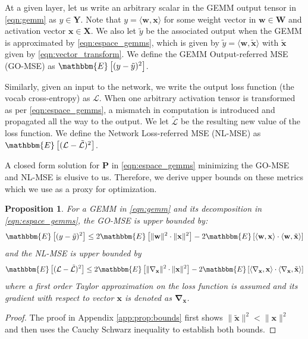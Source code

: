 \documentclass{article}
\theoremstyle{plain}
\newtheorem{proposition}[theorem]{Proposition}
\begin{document}
At a given layer, let us write an arbitrary scalar in the GEMM output tensor in \eqref{eqn:gemm} as $y\in \mathbf{Y}$. Note that $y=\langle \mathbf{w}, \mathbf{x} \rangle$ for some weight vector in $\mathbf{w}\in\mathbf{W}$ and activation vector $\mathbf{x}\in\mathbf{X}$. We also let $\tilde{y}$ be the associated output when the GEMM is approximated by \eqref{eqn:espace_gemms}, which is given by $\tilde{y}=\langle \mathbf{w}, \tilde{\mathbf{x}} \rangle$ with $\tilde{\mathbf{x}}$ given by \eqref{eqn:vector_transform}. We define the GEMM Output-referred MSE (GO-MSE) as 
$\mathbbm{E}\left[(y-\tilde{y})^2 \right]$.

Similarly, given an input to the network, we write the output loss function (the vocab cross-entropy) as $\mathcal{L}$. When one arbitrary activation tensor is transformed as per \eqref{eqn:espace_gemms}, a mismatch in computation is introduced and propagated all the way to the output. We let $\tilde{\mathcal{L}}$ be the resulting new value of the loss function. We define the Network Loss-referred MSE (NL-MSE) as $\mathbbm{E}\left[(\mathcal{L}-\tilde{\mathcal{L}})^2 \right]$.

A closed form solution for $\mathbf{P}$ in \eqref{eqn:espace_gemms} minimizing the GO-MSE and NL-MSE is elusive to us. Therefore, we derive upper bounds on these metrics which we use as a proxy for optimization.
\begin{proposition}
\label{prop:bounds}
    For a GEMM in \eqref{eqn:gemm} and its decomposition in \eqref{eqn:espace_gemms}, the GO-MSE is upper bounded by:
    \begin{align}
        \label{eqn:gomse_bound}
        \mathbbm{E}\left[(y-\tilde{y})^2 \right] \leq 2\mathbbm{E}\left[\lVert \mathbf{w} \rVert^2 \cdot \lVert \mathbf{x} \rVert^2 \right] -2\mathbbm{E}\left[ \langle\mathbf{w},\mathbf{x}\rangle \cdot\langle\mathbf{w},\tilde{\mathbf{x}}\rangle \right]
    \end{align}
    and the NL-MSE is upper bounded by
    \begin{align}
        \label{eqn:nlmse_bound}
        \mathbbm{E}\left[(\mathcal{L}-\tilde{\mathcal{L}})^2 \right] \leq 2\mathbbm{E}\left[\lVert \mathbf{\nabla}_{\mathbf{x}} \rVert^2 \cdot \lVert \mathbf{x} \rVert^2 \right] -2\mathbbm{E}\left[ \langle\mathbf{\nabla}_{\mathbf{x}},\mathbf{x}\rangle \cdot\langle\mathbf{\nabla}_{\mathbf{x}},\tilde{\mathbf{x}}\rangle \right]
    \end{align}
    where a first order Taylor approximation on the loss function is assumed and its gradient with respect to vector $\mathbf{x}$ is denoted as $\mathbf{\nabla}_{\mathbf{x}}$.
\end{proposition}
\begin{proof}
The proof in Appendix \ref{app:prop:bounds} first shows $\lVert \tilde{\mathbf{x}} \rVert^2<\lVert \mathbf{x} \rVert^2$ and then uses the Cauchy Schwarz inequality to establish both bounds.
\end{proof}
\end{document}

